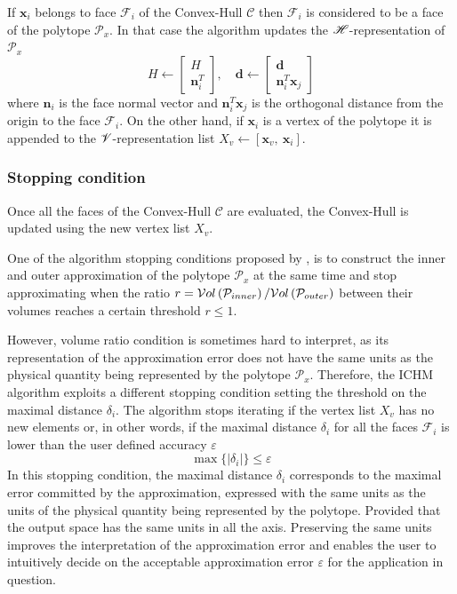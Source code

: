 If $\bm{x}_i$ belongs to face $\mathcal{F}_i$ of the Convex-Hull $\mathcal{C}$ then  $\mathcal{F}_i$ is considered to be a face of the polytope $\mathcal{P}_x$. In that case the algorithm updates the $\mathscr{H}$-representation of $\mathcal{P}_x$ 
\begin{equation}
    H \leftarrow \begin{bmatrix} H \\ \bm{n}_i^T\end{bmatrix}, \quad \bm{d} \leftarrow \begin{bmatrix}  \bm{d} \\ \bm{n}^T_i \bm{x}_{j} \end{bmatrix}
\label{eq:h_rep}
\end{equation}
where $\bm{n}_i$ is the face normal vector and $\bm{n}_i^T \bm{x}_{j}$ is the orthogonal distance from the origin to the face $\mathcal{F}_i$. On the other hand, if $\bm{x}_i$ is a vertex of the polytope it is appended to the $\mathscr{V}$-representation list $X_v \leftarrow [\bm{x}_v, ~\bm{x}_i]$.

\subsubsection{Stopping condition} 
Once all the faces of the Convex-Hull $\mathcal{C}$ are evaluated, the Convex-Hull is updated using the new vertex list $X_v$.

One of the algorithm stopping conditions proposed by \citet{Bretl2008}, is to construct the inner and outer approximation of the polytope $\mathcal{P}_x$ at the same time and stop approximating when the ratio $r=\mathcal{V}ol\left(\mathcal{P}_{inner}\right)/\mathcal{V}ol\left(\mathcal{P}_{outer}\right)$ between their volumes reaches a certain threshold $r\leq1$.  

However, volume ratio condition is sometimes hard to interpret, as its representation of the approximation error does not have the same units as the physical quantity being represented by the polytope $\mathcal{P}_x$. Therefore, the ICHM algorithm exploits a different stopping condition setting the threshold on the maximal distance $\delta_i$. The algorithm stops iterating if the vertex list $X_v$ has no new elements or, in other words, if the maximal distance $\delta_i$ for all the faces $\mathcal{F}_i$ is lower than the user defined accuracy $\varepsilon$  
\begin{equation}
    \max\{|\delta_{i}|\} \leq \varepsilon
\end{equation}
In this stopping condition, the maximal distance $\delta_i$ corresponds to the maximal error committed by the approximation, expressed with the same units as the units of the physical quantity being represented by the polytope. Provided that the output space has the same units in all the axis. Preserving the same units improves the interpretation of the approximation error and enables the user to intuitively decide on the acceptable approximation error $\varepsilon$ for the application in question. 

